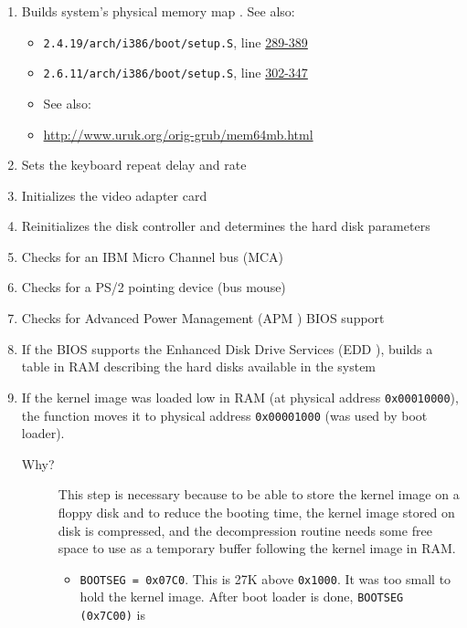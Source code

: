 \begin{enumerate}
\item Builds system's physical memory map . See also:
  \begin{itemize}
  \item \texttt{2.4.19/arch/i386/boot/setup.S}, line
    \href{http://lxr.linux.no/linux-old+v2.4.19/arch/i386/boot/setup.S\#L289}{289-389}
  \item \texttt{2.6.11/arch/i386/boot/setup.S}, line
    \href{http://lxr.linux.no/linux+v2.6.11/arch/i386/boot/setup.S\#L302}{302-347}
  \item See also: 
  \item \url{http://www.uruk.org/orig-grub/mem64mb.html}
  \end{itemize}
\item Sets the keyboard repeat delay and rate
\item Initializes the video adapter card
\item Reinitializes the disk controller and determines the hard disk parameters
\item Checks for an IBM Micro Channel bus (MCA)
\item Checks for a PS/2 pointing device (bus mouse)
\item Checks for Advanced Power Management (APM ) BIOS support
\item If the BIOS supports the Enhanced Disk Drive Services (EDD ), builds a table in RAM
  describing the hard disks available in the system
\item If the kernel image was loaded low in RAM (at physical address \texttt{0x00010000}),
  the function moves it to physical address \texttt{0x00001000} (was used by boot loader).
  \begin{description}
  \item[Why?] This step is necessary because to be able to store the kernel image on a
    floppy disk and to reduce the booting time, the kernel image stored on disk is
    compressed, and the decompression routine needs some free space to use as a temporary
    buffer following the kernel image in RAM.  
    \begin{itemize}
    \item \texttt{BOOTSEG = 0x07C0}. This is 27K above \texttt{0x1000}. It was too small to
      hold the kernel image. After boot loader is done, \texttt{BOOTSEG (0x7C00)} is

\end{itemize}
\end{description}
\end{enumerate}
